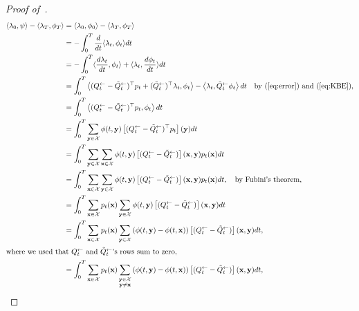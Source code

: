 \documentclass{article} %
\def\eqref#1{equation~\ref{#1}}
\newcommand{\bfx}{{\bf x}}
\newcommand{\bfy}{ {\bf y}}
\renewcommand{\eqref}[1]{\textup{(\ref{#1})}}
\begin{document}
\begin{proof}[Proof of~]
\begin{align*}
    \langle \lambda_0, \psi \rangle -\langle \lambda_T, \phi_T \rangle &= \langle \lambda_0, \phi_0 \rangle -\langle \lambda_T, \phi_T \rangle \\
    &= -\int_0^T \frac{d}{dt} \langle \lambda_t, \phi_t \rangle dt \\
    &= - \int_0^T  \langle \frac{d\lambda_t}{dt} , \phi_t \rangle +  \langle \lambda_t, \frac{d\phi_t}{dt}  \rangle dt \\
    &=  \int_0^T \left\langle (Q_{t}^{\leftarrow} - \tilde{Q}_{t}^{\leftarrow})^\top p_{t} + (\tilde{Q}_{t}^{\leftarrow})^\top \lambda_{t} , \phi_t \right\rangle -  \left\langle \lambda_t, \tilde{Q}_{t}^{\leftarrow} \phi_t  \right\rangle dt \quad \text{by~\eqref{eq:error} and~\eqref{eq:KBE}}, \\
    &= \int_0^T \left\langle (Q_{t}^{\leftarrow} - \tilde{Q}_{t}^{\leftarrow})^\top p_{t}  , \phi_t \right\rangle dt \\
    &= \int_0^T \sum_{\substack{\bfy\in\mathcal{X}}} \phi(t, \bfy) \left[ (Q_{t}^{\leftarrow} - \tilde{Q}_{t}^{\leftarrow})^\top p_t \right] (\bfy) dt \\
    &= \int_0^T \sum_{\substack{\bfy\in\mathcal{X}}} \sum_{\substack{\bfx\in\mathcal{X}}} \phi(t, \bfy) \left[ (Q_{t}^{\leftarrow} - \tilde{Q}_{t}^{\leftarrow}) \right] (\bfx, \bfy) p_t(\bfx) dt \\
    &= \int_0^T \sum_{\substack{\bfx\in\mathcal{X}}} \sum_{\substack{\bfy\in\mathcal{X}}} \phi(t, \bfy) \left[ (Q_{t}^{\leftarrow} - \tilde{Q}_{t}^{\leftarrow}) \right] (\bfx, \bfy) p_t(\bfx) dt, \quad \text{by Fubini's theorem,} \\
    &= \int_0^T \sum_{\substack{\bfx\in\mathcal{X}}} p_t(\bfx) \sum_{\substack{\bfy\in\mathcal{X}}} \phi(t, \bfy) \left[ (Q_{t}^{\leftarrow} - \tilde{Q}_{t}^{\leftarrow}) \right] (\bfx, \bfy)  dt \\
    &= \int_0^T \sum_{\substack{\bfx\in\mathcal{X}}} p_t(\bfx) \sum_{\substack{\bfy\in\mathcal{X}}} \left(\phi(t, \bfy)-\phi(t, \bfx) \right)\left[ (Q_{t}^{\leftarrow} - \tilde{Q}_{t}^{\leftarrow}) \right] (\bfx, \bfy)  dt, \\
    \intertext{where we used that $Q_{t}^{\leftarrow}$ and $\tilde{Q}_{t}^{\leftarrow}$'s rows sum to zero,}
    &= \int_0^T \sum_{\substack{\bfx\in\mathcal{X}}} p_t(\bfx) \sum_{\substack{\bfy\in\mathcal{X} \\ \bfy\neq \bfx}}  \left(\phi(t, \bfy)-\phi(t, \bfx) \right)\left[ (Q_{t}^{\leftarrow} - \tilde{Q}_{t}^{\leftarrow}) \right] (\bfx, \bfy)  dt, \\

\end{align*}
\end{proof}
\end{document}
